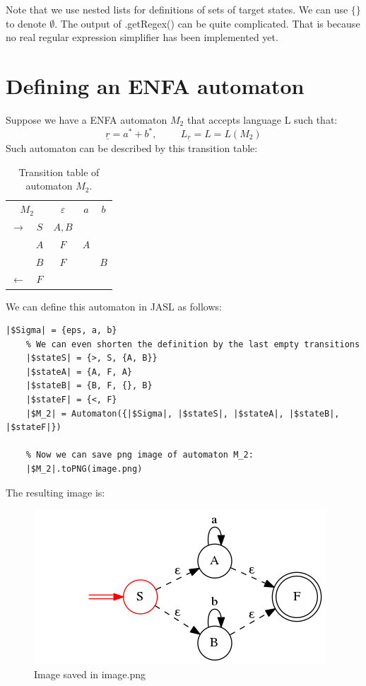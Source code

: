 \documentclass{ctuthesis}
\begin{document}
Note that we use nested lists for definitions of sets of target states. We can use $\{\}$ to denote $\emptyset$. The output of .getRegex() can be quite complicated. That is because no real regular expression simplifier has been implemented yet.

\section{Defining an ENFA automaton}
\label{sec:example_ENFA}
Suppose we have a ENFA automaton $M_2$ that accepts language L such that:
\begin{equation*}
	\underline{r} = a^*+b^*, \hspace{1cm} L_{\underline{r}} = L = L(M_2) 
\end{equation*}
Such automaton can be described by this transition table:
\begin{table}[H]
\begin{ctucolortab}
\begin{tabular}{cc|ccc}
\multicolumn{2}{c}{$M_2$} & $\varepsilon$ & $a$ & $b$ \\\Midrule
$\rightarrow$ 	& $S$ & $A,B$  \\
				& $A$ & $F$ 	& $A$  \\
				& $B$ & $F$		& & $B$ \\
$\leftarrow$	& $F$ & 		&  
\end{tabular}
\end{ctucolortab}
\caption{Transition table of automaton $M_2$.}
\label{fig:examples_DFA_table}
\end{table} 

We can define this automaton in JASL as follows:

\begin{minipage}{\linewidth}
\begin{lstlisting}[language = JASL]
	|$Sigma| = {eps, a, b}
	% We can even shorten the definition by the last empty transitions
	|$stateS| = {>, S, {A, B}}
	|$stateA| = {A, F, A}
	|$stateB| = {B, F, {}, B}
	|$stateF| = {<, F}
	|$M_2| = Automaton({|$Sigma|, |$stateS|, |$stateA|, |$stateB|, |$stateF|})
	
	% Now we can save png image of automaton M_2:
	|$M_2|.toPNG(image.png)	
\end{lstlisting}
\end{minipage}

The resulting image is:

\begin{figure}[H]
\includegraphics[width=0.8\linewidth]{figures/ENFA_definition.png}
\caption{Image saved in image.png}
\label{fig:ENFA_definition_example}
\end{figure}
\end{document}
